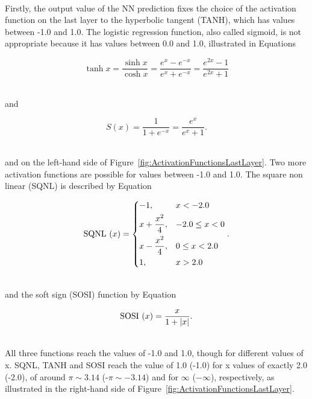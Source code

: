 \ \\Firstly, the output value of the NN prediction fixes the choice of the activation function on the last layer to the hyperbolic tangent (TANH), which has values between -1.0 and 1.0. The logistic regression function, also called sigmoid, is not appropriate because it has values between 0.0 and 1.0, illustrated in Equations

\begin{equation}
   \tanh x = \frac{\sinh x}{\cosh x} = \frac{e^x - e^{-x}}{e^x + e^{-x}} = \frac{e^{2x}-1}{e^{2x}+1}
\end{equation}

\ \\and

\begin{equation}
   S(x) = \frac{1}{1 + e^{-x}} = \frac{e^{x}}{e^{x}+1}.
\end{equation}

\ \\and on the left-hand side of Figure~\ref{fig:ActivationFunctionsLastLayer}. Two more activation functions are possible for values between -1.0 and 1.0. The square non linear (SQNL) is described by Equation

\begin{equation}
   \SQNL~(x) = 
\begin{dcases}
    -1 , & x < -2.0\\
    x + \frac{x^2}{4}, & -2.0 \leq x < 0\\
    x - \frac{x^2}{4}, & 0 \leq x < 2.0\\   
    1 , & x > 2.0\\
\end{dcases}.
\end{equation}

\ \\ and the soft sign (SOSI) function by Equation

\begin{equation}
   \SOSI~(x) = \frac{x}{1 + |x|}.
\end{equation}

\ \\All three functions reach the values of -1.0 and 1.0, though for different values of x. SQNL, TANH and SOSI reach the value of 1.0 (-1.0) for x values of exactly 2.0 (-2.0), of around $\pi \sim 3.14$ (-$\pi \sim -3.14$) and for $\infty$ ($-\infty$), respectively, as illustrated in the right-hand side of Figure~\ref{fig:ActivationFunctionsLastLayer}.

